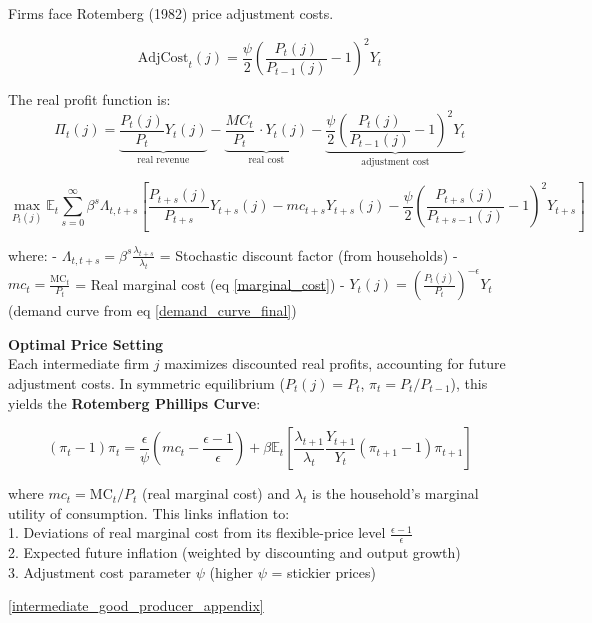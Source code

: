 \documentclass[11pt,preprint]{elsarticle}
\numberwithin{equation}{section}
\numberwithin{figure}{section}
\numberwithin{table}{section}
\begin{document}
Firms face Rotemberg (1982) price adjustment costs.

\[
\text{AdjCost}_t(j) = \frac{\psi}{2} \left( \frac{P_t(j)}{P_{t-1}(j)} - 1 \right)^2 Y_t
\]

The real profit function is: \begin{equation}
\Pi_t(j) = \underbrace{\frac{P_t(j)}{P_t} Y_t(j)}_{\text{real revenue}} - \underbrace{\frac{MC_t}{P_t}\,\cdot Y_t(j)}_{\text{real cost}} - \underbrace{\frac{\psi}{2} \left( \frac{P_t(j)}{P_{t-1}(j)} - 1 \right)^2 Y_t}_{\text{adjustment cost}}
\label{firm_profit}
\end{equation}

\[
\max_{P_t(j)} \mathbb{E}_t \sum_{s=0}^{\infty} \beta^s \Lambda_{t,t+s} \left[
\frac{P_{t+s}(j)}{P_{t+s}} Y_{t+s}(j) - mc_{t+s} Y_{t+s}(j) - \frac{\psi}{2} \left( \frac{P_{t+s}(j)}{P_{t+s-1}(j)} - 1 \right)^2 Y_{t+s}
\right]
\]

where: - \(\Lambda_{t,t+s} = \beta^s \frac{\lambda_{t+s}}{\lambda_t}\) =
Stochastic discount factor (from households) -
\(mc_t = \frac{\text{MC}_t}{P_t}\) = Real marginal cost (eq
\ref{marginal_cost}) -
\(Y_t(j) = \left( \frac{P_t(j)}{P_t} \right)^{-\epsilon} Y_t\) (demand
curve from eq \ref{demand_curve_final})

\textbf{Optimal Price Setting}\\
Each intermediate firm \(j\) maximizes discounted real profits,
accounting for future adjustment costs. In symmetric equilibrium
(\(P_t(j) = P_t\), \(\pi_t = P_t/P_{t-1}\)), this yields the
\textbf{Rotemberg Phillips Curve}:

\begin{equation}
(\pi_t - 1)\pi_t = \frac{\epsilon}{\psi} \left( mc_t - \frac{\epsilon-1}{\epsilon} \right) + \beta \mathbb{E}_t \left[ \frac{\lambda_{t+1}}{\lambda_t} \frac{Y_{t+1}}{Y_t} (\pi_{t+1} - 1)\pi_{t+1} \right]
\label{nkpc}
\end{equation}

where \(mc_t = \text{MC}_t / P_t\) (real marginal cost) and
\(\lambda_t\) is the household's marginal utility of consumption. This
links inflation to:\\
1. Deviations of real marginal cost from its flexible-price level
\(\frac{\epsilon-1}{\epsilon}\)\\
2. Expected future inflation (weighted by discounting and output
growth)\\
3. Adjustment cost parameter \(\psi\) (higher \(\psi\) = stickier
prices)

\ref{intermediate_good_producer_appendix}
\end{document}
